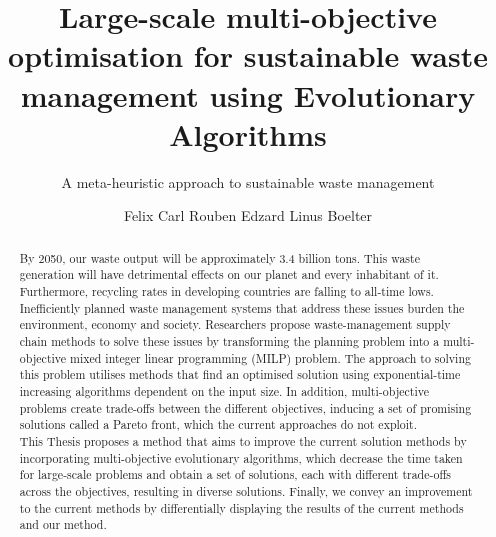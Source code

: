 \documentclass[mscthesis, 11pt]{usiinfthesis}
\title{Large-scale multi-objective optimisation for sustainable waste management using Evolutionary Algorithms} %
\subtitle{A meta-heuristic approach to sustainable waste management} %
\author{Felix Carl Rouben Edzard Linus Boelter} %
\theoremstyle{newdefinition}
\begin{document}
\maketitle %

\frontmatter %

\begin{abstract}
    By 2050, our waste output will be approximately 3.4 billion tons. This waste generation will have detrimental effects on our planet and every inhabitant of it. Furthermore, recycling rates in developing countries are falling to all-time lows. Inefficiently planned waste management systems that address these issues burden the environment, economy and society. Researchers propose waste-management supply chain methods to solve these issues by transforming the planning problem into a multi-objective mixed integer linear programming (MILP) problem. The approach to solving this problem utilises methods that find an optimised solution using exponential-time increasing algorithms dependent on the input size. In addition, multi-objective problems create trade-offs between the different objectives, inducing a set of promising solutions called a Pareto front, which the current approaches do not exploit. \\
    This Thesis proposes a method that aims to improve the current solution methods by incorporating multi-objective evolutionary algorithms, which decrease the time taken for large-scale problems and obtain a set of solutions, each with different trade-offs across the objectives, resulting in diverse solutions. Finally, we convey an improvement to the current methods by differentially displaying the results of the current methods and our method.
\end{abstract}
\end{document}
